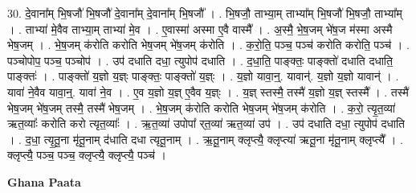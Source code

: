 \documentclass[17pt]{extarticle}
\begin{document}
30. दे॒वाना᳚म् भि॒षजौ॑ भि॒षजौ॑ दे॒वाना᳚म् दे॒वाना᳚म् भि॒षजौ᳚ । . भि॒षजौ॒ ताभ्या॒म् ताभ्या᳚म् भि॒षजौ॑ भि॒षजौ॒ ताभ्या᳚म् । . ताभ्या॑ मे॒वैव ताभ्या॒म् ताभ्या॑ मे॒व । . ए॒वास्मा॑ अस्मा ए॒वै वास्मै᳚ । . अ॒स्मै॒ भे॒ष॒जम् भे॑ष॒ज म॑स्मा अस्मै भेष॒जम् । . भे॒ष॒जम् क॑रोति करोति भेष॒जम् भे॑ष॒जम् क॑रोति । . क॒रो॒ति॒ पञ्च॒ पञ्च॑ करोति करोति॒ पञ्च॑ । . पञ्चोपोप॒ पञ्च॒ पञ्चोप॑ । . उप॑ दधाति दधा॒ त्युपोप॑ दधाति । . द॒धा॒ति॒ पाङ्क्तः॒ पाङ्क्तो॑ दधाति दधाति॒ पाङ्क्तः॑ । . पाङ्क्तो॑ य॒ज्ञो य॒ज्ञ्ः पाङ्क्तः॒ पाङ्क्तो॑ य॒ज्ञ्ः । . य॒ज्ञो यावा॒न्॒. यावान्॑. य॒ज्ञो य॒ज्ञो यावान्॑ । . यावा॑ ने॒वैव यावा॒न्॒. यावा॑ ने॒व । . ए॒व य॒ज्ञो य॒ज्ञ् ए॒वैव य॒ज्ञ्ः । . य॒ज्ञ् स्तस्मै॒ तस्मै॑ य॒ज्ञो य॒ज्ञ् स्तस्मै᳚ । . तस्मै॑ भेष॒जम् भे॑ष॒जम् तस्मै॒ तस्मै॑ भेष॒जम् । . भे॒ष॒जम् क॑रोति करोति भेष॒जम् भे॑ष॒जम् क॑रोति । . क॒रो॒ त्यृ॒त॒व्या॑ ऋत॒व्याः᳚ करोति करो त्यृत॒व्याः᳚ । . ऋ॒त॒व्या॑ उपोपा᳚ र्‌त॒व्या॑ ऋत॒व्या॑ उप॑ । . उप॑ दधाति दधा॒ त्युपोप॑ दधाति । . द॒धा॒ त्यृ॒तू॒ना मृ॑तू॒नाम् द॑धाति दधा त्यृतू॒नाम् । . ऋ॒तू॒नाम् क्लृप्त्यै॒ क्लृप्त्या॑ ऋतू॒ना मृ॑तू॒नाम् क्लृप्त्यै᳚ । . क्लृप्त्यै॒ पञ्च॒ पञ्च॒ क्लृप्त्यै॒ क्लृप्त्यै॒ पञ्च॑ । \newline

\textbf{Ghana Paata } \newline
\end{document}

